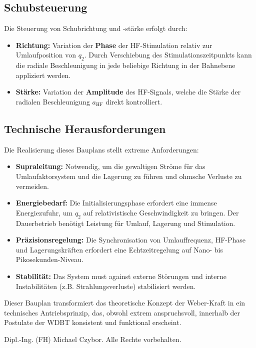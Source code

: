 \documentclass[11pt, a4paper]{article}
\begin{document}
\subsection{Schubsteuerung}

Die Steuerung von Schubrichtung und -stärke erfolgt durch:
\begin{itemize}
    \item \textbf{Richtung:} Variation der \textbf{Phase} der HF-Stimulation relativ zur Umlaufposition von $q_2$. Durch Verschiebung des Stimulationszeitpunkts kann die radiale Beschleunigung in jede beliebige Richtung in der Bahnebene appliziert werden.
    \item \textbf{Stärke:} Variation der \textbf{Amplitude} des HF-Signals, welche die Stärke der radialen Beschleunigung $a_{\text{HF}}$ direkt kontrolliert.
\end{itemize}

\subsection{Technische Herausforderungen}

Die Realisierung dieses Bauplans stellt extreme Anforderungen:
\begin{itemize}
    \item \textbf{Supraleitung:} Notwendig, um die gewaltigen Ströme für das Umlaufaktorsystem und die Lagerung zu führen und ohmsche Verluste zu vermeiden.
    \item \textbf{Energiebedarf:} Die Initialisierungsphase erfordert eine immense Energiezufuhr, um $q_2$ auf relativistische Geschwindigkeit zu bringen. Der Dauerbetrieb benötigt Leistung für Umlauf, Lagerung und Stimulation.
    \item \textbf{Präzisionsregelung:} Die Synchronisation von Umlauffrequenz, HF-Phase und Lagerungskräften erfordert eine Echtzeitregelung auf Nano- bis Pikosekunden-Niveau.
    \item \textbf{Stabilität:} Das System must against externe Störungen und interne Instabilitäten (z.B. Strahlungsverluste) stabilisiert werden.
\end{itemize}

Dieser Bauplan transformiert das theoretische Konzept der Weber-Kraft in ein technisches Antriebsprinzip, das, obwohl extrem anspruchsvoll, innerhalb der Postulate der WDBT
konsistent und funktional erscheint. \newline

\textcopyright{} \the\year{} Dipl.-Ing. (FH) Michael Czybor. Alle Rechte vorbehalten.
\end{document}
